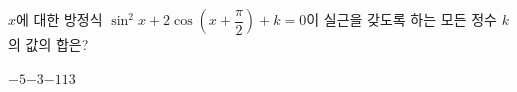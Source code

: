 $x$에 대한 방정식 $\sin^2 x+2\cos\left(x+\dfrac{\pi}{2}\right)+k=0$이 실근을 갖도록 하는 모든 정수 $k$의 값의 합은?
\begin{choices32}{$-5$}{$-3$}{$-1$}{$1$}{$3$}\end{choices32}

